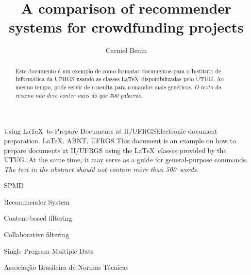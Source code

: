 \documentclass[cic,tc,english]{iiufrgs}
\title{A comparison of recommender systems for crowdfunding projects}
\author{Carniel Benin}{Adriano}
\begin{document}
\maketitle





\begin{abstract}
    Este documento é um exemplo de como formatar documentos para o
    Instituto de Informática da UFRGS usando as classes \LaTeX\
    disponibilizadas pelo UTUG\@. Ao mesmo tempo, pode servir de consulta
    para comandos mais genéricos. \emph{O texto do resumo não deve
      conter mais do que 500 palavras.}
\end{abstract}

\begin{englishabstract}{Using \LaTeX\ to Prepare Documents at II/UFRGS}{Electronic document preparation. \LaTeX. ABNT. UFRGS}
    This document is an example on how to prepare documents at II/UFRGS
    using the \LaTeX\ classes provided by the UTUG\@. At the same time, it
    may serve as a guide for general-purpose commands. \emph{The text in
      the abstract should not contain more than 500~words.}
\end{englishabstract}

\listoffigures

\listoftables

\begin{listofabbrv}{SPMD}
    \item[RS] Recommender System
    \item[CBF] Content-based filtering
    \item[CF] Collaborative filtering
    \item[SPMD] Single Program Multiple Data
    \item[ABNT] Associação Brasileira de Normas Técnicas
\end{listofabbrv}
\end{document}
